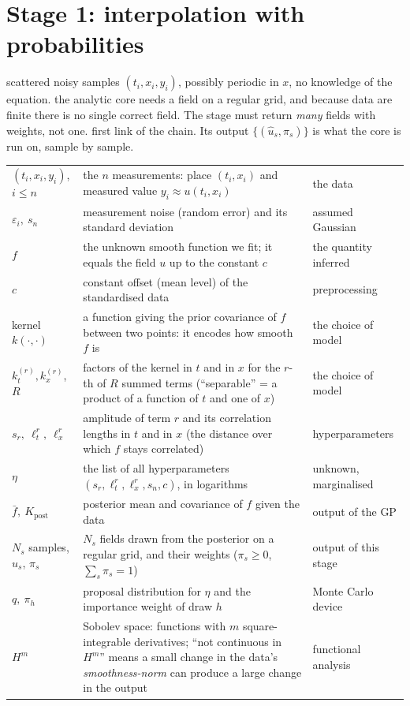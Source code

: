 \section{Stage 1: interpolation with probabilities}\label{sec:interp}
\sectionbrief
{scattered noisy samples $(t_i,x_i,y_i)$, possibly periodic in $x$, no knowledge of the equation.}
{the analytic core needs a field on a regular grid, and because data are finite there is no single correct field. The stage must return \emph{many} fields with weights, not one.}
{first link of the chain. Its output $\{(\hat u_s,\pi_s)\}$ is what the core is run on, sample by sample.}

\begin{symbols}
\begin{tabular}{@{}L{2.5cm}L{6.0cm}L{4.4cm}@{}}
$(t_i,x_i,y_i)$, $i\le n$ & the $n$ measurements: place $(t_i,x_i)$ and measured value $y_i\approx u(t_i,x_i)$ & the data\\
$\varepsilon_i,\ s_n$ & measurement noise (random error) and its standard deviation & assumed Gaussian\\
$f$ & the unknown smooth function we fit; it equals the field $u$ up to the constant $c$ & the quantity inferred\\
$c$ & constant offset (mean level) of the standardised data & preprocessing\\
kernel $k(\cdot,\cdot)$ & a function giving the prior covariance of $f$ between two points: it encodes how smooth $f$ is & the choice of model\\
$k_t^{(r)},k_x^{(r)}$, $R$ & factors of the kernel in $t$ and in $x$ for the $r$-th of $R$ summed terms (``separable'' = a product of a function of $t$ and one of $x$) & the choice of model\\
$s_r,\ \ell_t^r,\ \ell_x^r$ & amplitude of term $r$ and its correlation lengths in $t$ and in $x$ (the distance over which $f$ stays correlated) & hyperparameters\\
$\eta$ & the list of all hyperparameters $(s_r,\ell_t^r,\ell_x^r,s_n,c)$, in logarithms & unknown, marginalised\\
$\bar f,\ K_{\mathrm{post}}$ & posterior mean and covariance of $f$ given the data & output of the GP\\
$N_s$ samples, $\hat u_s$, $\pi_s$ & $N_s$ fields drawn from the posterior on a regular grid, and their weights ($\pi_s\ge0$, $\sum_s\pi_s=1$) & output of this stage\\
$q,\ \pi_h$ & proposal distribution for $\eta$ and the importance weight of draw $h$ & Monte Carlo device\\
$H^m$ & Sobolev space: functions with $m$ square-integrable derivatives; ``not continuous in $H^m$'' means a small change in the data's \emph{smoothness-norm} can produce a large change in the output & functional analysis\\
\end{tabular}
\end{symbols}

